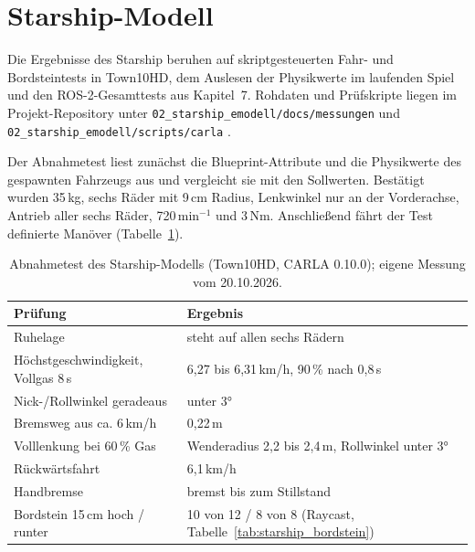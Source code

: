 \section{Starship-Modell}
\label{sec:val_starship}

Die Ergebnisse des Starship beruhen auf skriptgesteuerten Fahr- und Bordsteintests in
Town10HD, dem Auslesen der Physikwerte im laufenden Spiel und den ROS-2-Gesamttests
aus Kapitel~7. Rohdaten und Prüfskripte liegen im Projekt-Repository unter
\texttt{02\_starship\_emodell/docs/messungen} und \texttt{02\_starship\_emodell/scripts/carla}
\parencite{rauch_lee_repo}.

Der Abnahmetest liest zunächst die Blueprint-Attribute und die Physikwerte des
gespawnten Fahrzeugs aus und vergleicht sie mit den Sollwerten. Bestätigt wurden
35\,kg, sechs Räder mit 9\,cm Radius, Lenkwinkel nur an der Vorderachse, Antrieb aller
sechs Räder, 720\,min$^{-1}$ und 3\,Nm. Anschließend fährt der Test definierte Manöver
(Tabelle~\ref{tab:val_starship}).

\begin{table}[htbp]
  \centering
  \caption{Abnahmetest des Starship-Modells (Town10HD, CARLA 0.10.0); eigene Messung vom
  20.10.2026.}
  \label{tab:val_starship}
  \begin{tabular}{ll}
    \hline
    Prüfung & Ergebnis \\
    \hline
    Ruhelage & steht auf allen sechs Rädern \\
    Höchstgeschwindigkeit, Vollgas 8\,s & 6,27 bis 6,31\,km/h, 90\,\% nach 0,8\,s \\
    Nick-/Rollwinkel geradeaus & unter 3° \\
    Bremsweg aus ca. 6\,km/h & 0,22\,m \\
    Volllenkung bei 60\,\% Gas & Wenderadius 2,2 bis 2,4\,m, Rollwinkel unter 3° \\
    Rückwärtsfahrt & 6,1\,km/h \\
    Handbremse & bremst bis zum Stillstand \\
    Bordstein 15\,cm hoch / runter & 10 von 12 / 8 von 8 (Raycast, Tabelle~\ref{tab:starship_bordstein}) \\
    \hline
  \end{tabular}
\end{table}

